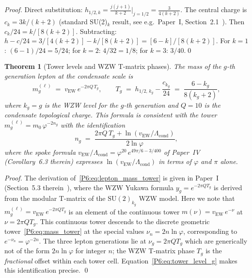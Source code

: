 \documentclass[11pt,a4paper]{article}
\newtheorem{theorem}{Theorem}[section]
\theoremstyle{definition}
\theoremstyle{remark}
\newcommand{\vp}{\varphi}
\newcommand{\vEW}{v_{\mathrm{EW}}}
\newcommand{\Lcond}{\Lambda_{\mathrm{cond}}}
\begin{document}
\begin{proof}
Direct substitution: $h_{1/2,k} = \tfrac{j(j+1)}{k+2}\big|_{j=1/2} = \tfrac{3}{4(k+2)}$.
The central charge is $c_k = 3k/(k+2)$ (standard SU(2)$_k$ result,
see e.g.\ Paper~I, Section~2.1~\cite{Paper1}).
Then $c_k/24 = k/[8(k+2)]$.
Subtracting: $h - c/24 = 3/[4(k+2)] - k/[8(k+2)] = [6-k]/[8(k+2)]$.
For $k=1$: $(6-1)/24 = 5/24$; for $k=2$: $4/32 = 1/8$; for $k=3$: $3/40$.\qed
\end{proof}

\begin{theorem}[Tower levels and WZW T-matrix phases]
\label{P6:thm:wzw_connection}
The mass of the $g$-th generation lepton at the condensate scale is
\begin{equation}
  m_g^{(\ell)} \;=\; \vEW\,e^{-2\pi Q\,T_g},
  \qquad
  T_g \;=\; h_{1/2,\,k_g} - \frac{c_{k_g}}{24}
  \;=\; \frac{6-k_g}{8(k_g+2)},
  \label{P6:eq:lepton_mass_tower}
\end{equation}
where $k_g = g$ is the WZW level for the $g$-th generation and
$Q = 10$ is the condensate topological charge.
This formula is consistent with the tower $m_g^{(\ell)} = m_0\,\vp^{-2n_g}$
with the identification
\begin{equation}
  n_g \;=\; \frac{2\pi Q\,T_g + \ln(\vEW/\Lcond)}{2\ln\vp},
  \label{P6:eq:tower_level_g}
\end{equation}
where the spoke formula $\vEW/\Lcond = \vp^{20}\,e^{49\pi/6 - 3/400}$
of Paper~IV~\cite{Paper4} (Corollary~6.3 therein) expresses
$\ln(\vEW/\Lcond)$ in terms of $\vp$ and $\pi$ alone.
\end{theorem}

\begin{proof}
The derivation of~\eqref{P6:eq:lepton_mass_tower} is given in Paper~I
(Section~5.3 therein~\cite{Paper1}), where the WZW Yukawa formula
$y_g = e^{-2\pi Q T_g}$ is derived from the modular T-matrix of the
$\mathrm{SU}(2)_{k_g}$ WZW model.
Here we note that $m_g^{(\ell)} = \vEW\,e^{-2\pi Q T_g}$ is an
element of the continuous tower $m(\nu) = \vEW\,e^{-\nu}$ at
$\nu = 2\pi Q T_g$.  This continuous tower descends to the discrete
geometric tower~\eqref{P6:eq:mass_tower} at the special values
$\nu_n = 2n\ln\vp$, corresponding to $e^{-\nu_n} = \vp^{-2n}$.
The three lepton generations lie at $\nu_g = 2\pi Q T_g$ which are
generically not of the form $2n\ln\vp$ for integer $n$; the
WZW T-matrix phase $T_g$ is the \emph{fractional} offset within each
tower cell.  Equation~\eqref{P6:eq:tower_level_g} makes this identification
precise.
\qed
\end{proof}
\end{document}
